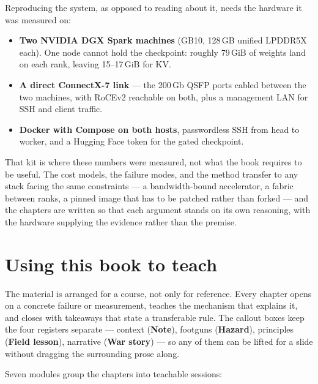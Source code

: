 Reproducing the system, as opposed to reading about it, needs the hardware it
was measured on:

\begin{itemize}
  \item \textbf{Two NVIDIA DGX Spark machines} (GB10, 128\,GB unified
    LPDDR5X each). One node cannot hold the checkpoint: roughly 79\,GiB of
    weights land on each rank, leaving 15--17\,GiB for KV.
  \item \textbf{A direct ConnectX-7 link} --- the 200\,Gb QSFP ports cabled
    between the two machines, with RoCEv2 reachable on both, plus a
    management LAN for SSH and client traffic.
  \item \textbf{Docker with Compose on both hosts}, passwordless SSH from
    head to worker, and a Hugging Face token for the gated checkpoint.
\end{itemize}

That kit is where these numbers were measured, not what the book requires to
be useful. The cost models, the failure modes, and the method transfer to any
stack facing the same constraints --- a bandwidth-bound accelerator, a fabric
between ranks, a pinned image that has to be patched rather than forked ---
and the chapters are written so that each argument stands on its own
reasoning, with the hardware supplying the evidence rather than the premise.

\section*{Using this book to teach}

The material is arranged for a course, not only for reference. Every chapter
opens on a concrete failure or measurement, teaches the mechanism that
explains it, and closes with takeaways that state a transferable rule. The
callout boxes keep the four registers separate --- context
(\textbf{Note}), footguns (\textbf{Hazard}), principles (\textbf{Field
lesson}), narrative (\textbf{War story}) --- so any of them can be lifted for
a slide without dragging the surrounding prose along.

Seven modules group the chapters into teachable sessions:

